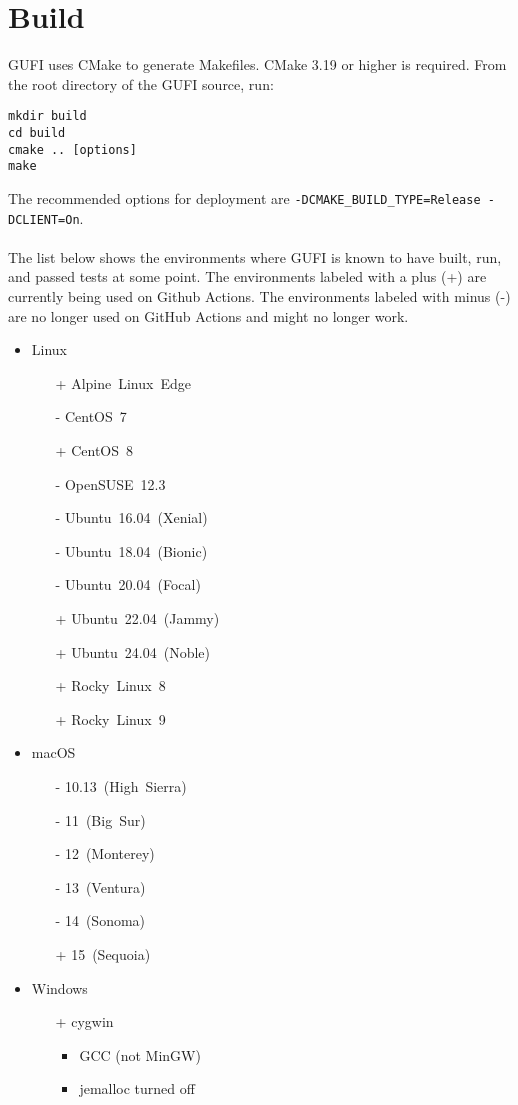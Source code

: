 \section{Build}

GUFI uses CMake to generate Makefiles. CMake 3.19 or higher is
required. From the root directory of the GUFI source, run:
\begin{verbatim}
mkdir build
cd build
cmake .. [options]
make
\end{verbatim}

The recommended options for deployment are
\texttt{-DCMAKE\_BUILD\_TYPE=Release -DCLIENT=On}.
\\\\
The list below shows the environments where GUFI is known to have
built, run, and passed tests at some point. The environments labeled
with a plus (+) are currently being used on Github Actions. The
environments labeled with minus (-) are no longer used on GitHub
Actions and might no longer work.
\begin{itemize}
\item Linux
  \begin{itemize}
  \item[+] Alpine~Linux~Edge
  \item[-] CentOS~7
  \item[+] CentOS~8
  \item[-] OpenSUSE~12.3
  \item[-] Ubuntu~16.04~(Xenial)
  \item[-] Ubuntu~18.04~(Bionic)
  \item[-] Ubuntu~20.04~(Focal)
  \item[+] Ubuntu~22.04~(Jammy)
  \item[+] Ubuntu~24.04~(Noble)
  \item[+] Rocky~Linux~8
  \item[+] Rocky~Linux~9
  \end{itemize}
\item macOS
  \begin{itemize}
  \item[-] 10.13~(High~Sierra)
  \item[-] 11~(Big~Sur)
  \item[-] 12~(Monterey)
  \item[-] 13~(Ventura)
  \item[-] 14~(Sonoma)
  \item[+] 15~(Sequoia)
  \end{itemize}
\item Windows
  \begin{itemize}
  \item[+] cygwin
    \begin{itemize}
    \item GCC (not MinGW)
    \item jemalloc turned off
    \end{itemize}
  \end{itemize}
\end{itemize}

